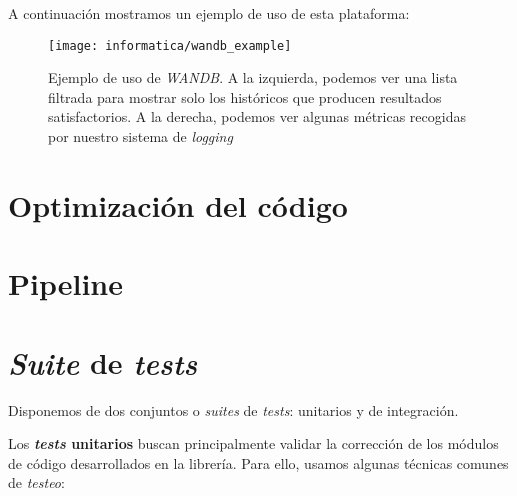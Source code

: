 A continuación mostramos un ejemplo de uso de esta plataforma:

\begin{figure}[H]
    \centering
    \texttt{[image: informatica/wandb\_example]}
    \caption{Ejemplo de uso de \textit{WANDB}. A la izquierda, podemos ver una lista filtrada para mostrar solo los históricos que producen resultados satisfactorios. A la derecha, podemos ver algunas métricas recogidas por nuestro sistema de \textit{logging}}
\end{figure}

\section{Optimización del código} \label{isec:optimizacion_codigo}

\section{Pipeline} \label{isec:pipeline}

\section{\textit{Suite} de \textit{tests}} \label{isec:test_suite}

Disponemos de dos conjuntos o \textit{suites} de \textit{tests}: unitarios y de integración.

Los \textbf{\textit{tests} unitarios} buscan principalmente validar la corrección de los módulos de código desarrollados en la librería. Para ello, usamos algunas técnicas comunes de \textit{testeo}:


